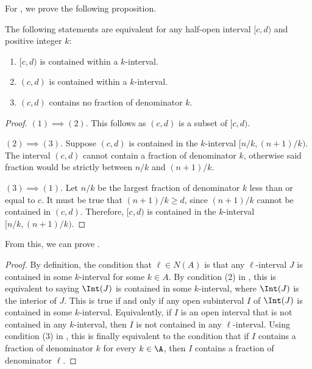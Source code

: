 For ,  we prove the following proposition.
\begin{proposition}
    \label{prop:intervalcondition-1}
    The following statements are equivalent for any half-open interval $[c,d)$ and positive integer $k$:
    \begin{enumerate}[(1)]
        \item $[c,d)$ is contained within a $k$-interval.
        \item $(c,d)$ is contained within a $k$-interval.
        \item $(c,d)$ contains no fraction of denominator $k$.
    \end{enumerate}
\end{proposition}

\begin{proof} $(1) \implies (2)$. This follows as $(c,d)$ is a subset of $[c,d)$.
        
        $(2) \implies (3)$. Suppose $(c,d)$ is contained in the $k$-interval $[n/k, (n+1)/k)$. The interval $(c,d)$ cannot contain a fraction of denominator $k$, otherwise said fraction would be strictly between $n/k$ and $(n+1)/k$.
        
        $(3) \implies (1)$. Let $n/k$ be the largest fraction of denominator $k$ less than or equal to $c$. It must be true that $(n+1)/k\ge d$, since $(n+1)/k$ cannot be contained in $(c,d)$. Therefore, $[c,d)$ is contained in the $k$-interval $[n/k, (n+1)/k)$.
\end{proof}

From this, we can prove . 

\begin{proof}
    By definition, the condition that $\ell\in N(A)$ is that any $\ell$-interval $J$ is contained in some $k$-interval for some $k\in A$. By condition (2) in , this is equivalent to saying $\Int(J)$ is contained in some $k$-interval, where $\Int(J)$ is the interior of $J$. This is true if and only if any open subinterval $I$ of $\Int(J)$ is contained in some $k$-interval. Equivalently, if $I$ is an open interval that is not contained in any $k$-interval, then $I$ is not contained in any $\ell$-interval. Using condition (3) in , this is finally equivalent to the condition that if $I$ contains a fraction of denominator $k$ for every $k\in \A$, then $I$ contains a fraction of denominator $\ell$.
\end{proof}

